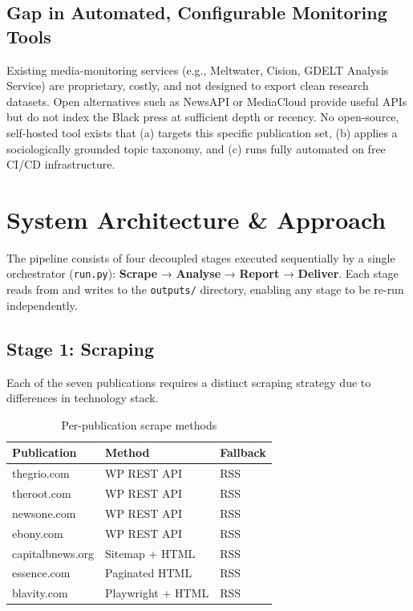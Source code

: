 \documentclass[sigconf,anonymous,review]{acmart}
\begin{document}
\subsection{Gap in Automated, Configurable Monitoring Tools}

Existing media-monitoring services (e.g., Meltwater, Cision, GDELT Analysis
Service) are proprietary, costly, and not designed to export clean research
datasets.
Open alternatives such as NewsAPI or MediaCloud provide useful APIs but do not
index the Black press at sufficient depth or recency.
No open-source, self-hosted tool exists that (a) targets this specific
publication set, (b) applies a sociologically grounded topic taxonomy, and
(c) runs fully automated on free CI/CD infrastructure.

\section{System Architecture \& Approach}

The pipeline consists of four decoupled stages executed sequentially by a single
orchestrator (\texttt{run.py}): \textbf{Scrape} → \textbf{Analyse} →
\textbf{Report} → \textbf{Deliver}.
Each stage reads from and writes to the \texttt{outputs/} directory, enabling
any stage to be re-run independently.

\subsection{Stage 1: Scraping}

Each of the seven publications requires a distinct scraping strategy due to
differences in technology stack.

\begin{table}[h]
\caption{Per-publication scrape methods}
\label{tab:sources}
\small
\begin{tabular}{lll}
\toprule
\textbf{Publication} & \textbf{Method} & \textbf{Fallback} \\
\midrule
thegrio.com      & WP REST API  & RSS  \\
theroot.com      & WP REST API  & RSS  \\
newsone.com      & WP REST API  & RSS  \\
ebony.com        & WP REST API  & RSS  \\
capitalbnews.org & Sitemap + HTML & RSS \\
essence.com      & Paginated HTML & RSS \\
blavity.com      & Playwright + HTML & RSS \\
\bottomrule
\end{tabular}
\end{table}
\end{document}
